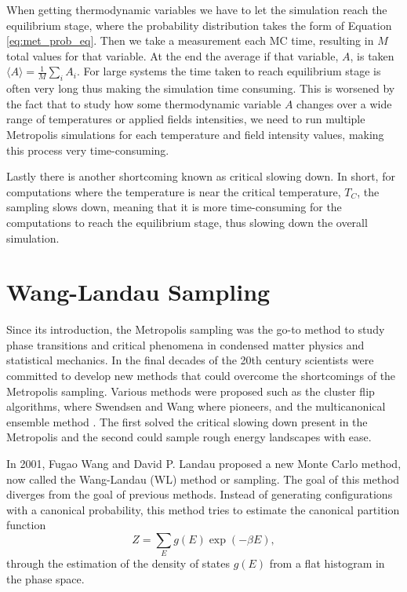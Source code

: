 When getting thermodynamic variables we have to let the simulation reach the equilibrium stage, where the probability distribution takes the form of Equation \ref{eq:met_prob_eq}. Then we take a measurement each MC time, resulting in $M$ total values for that variable. At the end the average if that variable, $A$, is taken $\langle A \rangle = \frac{1}{M} \sum_i A_i$. 
For large systems the time taken to reach equilibrium stage is often very long thus making the simulation time consuming. 
This is worsened by the fact that to study how some thermodynamic variable $A$ changes over a wide range of temperatures or applied fields intensities, we need to run multiple Metropolis simulations for each temperature and field intensity values, making this process very time-consuming.

Lastly there is another shortcoming known as critical slowing down. In short, for computations where the temperature is near the critical temperature, $T_C$, the sampling slows down, meaning that it is more time-consuming for the computations to reach the equilibrium stage, thus slowing down the overall simulation.

\section{Wang-Landau Sampling}

Since its introduction, the Metropolis sampling was the go-to method to study phase transitions and critical phenomena in condensed matter physics and statistical mechanics. In the final decades of the 20th century scientists were committed to develop new methods that could overcome the shortcomings of the Metropolis sampling. Various methods were proposed such as the cluster flip algorithms, where Swendsen and Wang where pioneers, and the multicanonical ensemble method \cite{WL_Original}. The first solved the critical slowing down present in the Metropolis and the second could sample rough energy landscapes with ease. 

In 2001, Fugao Wang and David P. Landau \cite{WL_Original, WL_Edu} proposed a new Monte Carlo method, now called the Wang-Landau (WL) method or sampling. The goal of this method diverges from the goal of previous methods. Instead of generating configurations with a canonical probability, this method tries to estimate the canonical partition function
\begin{equation}
	Z = \sum_E g(E) \exp(-\beta E),
\end{equation}
through the estimation of the density of states $g(E)$ from a flat histogram in the phase space.


